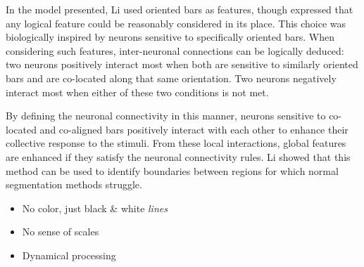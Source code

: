 \documentclass[journal,onecolumn]{IEEEtran}
\begin{document}
In the model presented, Li used oriented bars as features, though expressed that any logical feature could be reasonably considered in its place. This choice was biologically inspired by neurons sensitive to specifically oriented bars. When considering such features, inter-neuronal connections can be logically deduced: two neurons positively interact most when both are sensitive to similarly oriented bars and are co-located along that same orientation. Two neurons negatively interact most when either of these two conditions is not met.

By defining the neuronal connectivity in this manner, neurons sensitive to co-located and co-aligned bars positively interact with each other to enhance their collective response to the stimuli. From these local interactions, global features are enhanced if they satisfy the neuronal connectivity rules. Li showed that this method can be used to identify boundaries between regions for which normal segmentation methods struggle.

\begin{itemize}
    \item No color, just black \& white \textit{lines}
    \item No sense of scales
    \item Dynamical processing
\end{itemize}
\end{document}
